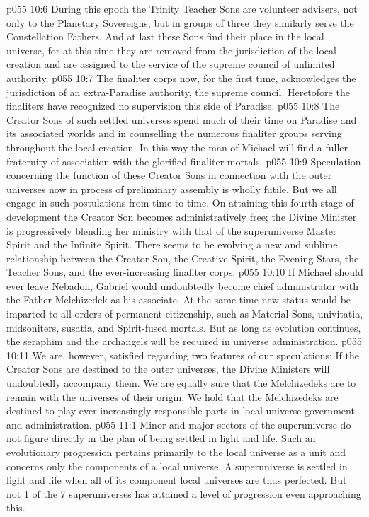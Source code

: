 \vs p055 10:6 During this epoch the Trinity Teacher Sons are volunteer advisers, not only to the Planetary Sovereigns, but in groups of three they similarly serve the Constellation Fathers. And at last these Sons find their place in the local universe, for at this time they are removed from the jurisdiction of the local creation and are assigned to the service of the supreme council of unlimited authority.
\vs p055 10:7 \pc The finaliter corps now, for the first time, acknowledges the jurisdiction of an extra\hyp{}Paradise authority, the supreme council. Heretofore the finaliters have recognized no supervision this side of Paradise.
\vs p055 10:8 The Creator Sons of such settled universes spend much of their time on Paradise and its associated worlds and in counselling the numerous finaliter groups serving throughout the local creation. In this way the man of Michael will find a fuller fraternity of association with the glorified finaliter mortals.
\vs p055 10:9 \pc Speculation concerning the function of these Creator Sons in connection with the outer universes now in process of preliminary assembly is wholly futile. But we all engage in such postulations from time to time. On attaining this fourth stage of development the Creator Son becomes administratively free; the Divine Minister is progressively blending her ministry with that of the superuniverse Master Spirit and the Infinite Spirit. There seems to be evolving a new and sublime relationship between the Creator Son, the Creative Spirit, the Evening Stars, the Teacher Sons, and the ever\hyp{}increasing finaliter corps.
\vs p055 10:10 If Michael should ever leave Nebadon, Gabriel would undoubtedly become chief administrator with the Father Melchizedek as his associate. At the same time new status would be imparted to all orders of permanent citizenship, such as Material Sons, univitatia, midsoniters, susatia, and Spirit\hyp{}fused mortals. But as long as evolution continues, the seraphim and the archangels will be required in universe administration.
\vs p055 10:11 We are, however, satisfied regarding two features of our speculations: If the Creator Sons are destined to the outer universes, the Divine Ministers will undoubtedly accompany them. We are equally sure that the Melchizedeks are to remain with the universes of their origin. We hold that the Melchizedeks are destined to play ever\hyp{}increasingly responsible parts in local universe government and administration.
\vs p055 11:1 Minor and major sectors of the superuniverse do not figure directly in the plan of being settled in light and life. Such an evolutionary progression pertains primarily to the local universe as a unit and concerns only the components of a local universe. A superuniverse is settled in light and life when all of its component local universes are thus perfected. But not 1 of the 7 superuniverses has attained a level of progression even approaching this.
